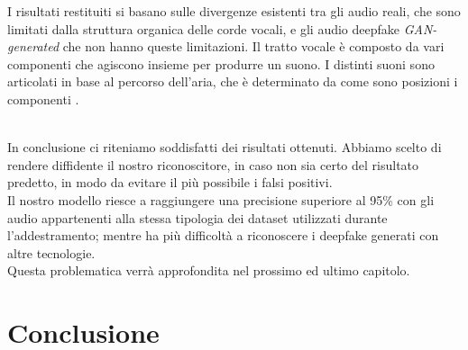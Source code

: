 \documentclass[12pt, a4paper]{article}
\begin{document}
\begin{minipage}{0.6\textwidth}
I risultati restituiti si basano sulle divergenze esistenti tra gli audio reali, che sono limitati dalla struttura organica delle corde vocali, e gli audio deepfake \textit{GAN-generated} che non hanno queste limitazioni. Il tratto vocale è composto da vari componenti che agiscono insieme per produrre un suono. I distinti suoni sono articolati in base al percorso dell'aria, che è determinato da come sono posizioni i componenti \cite{280020}.\\
\end{minipage}
\\
In conclusione ci riteniamo soddisfatti dei risultati ottenuti. Abbiamo scelto di rendere diffidente il nostro riconoscitore, in caso non sia certo del risultato predetto, in modo da evitare il più possibile i falsi positivi.\\ 
Il nostro modello riesce a raggiungere una precisione superiore al 95\% con gli audio appartenenti alla stessa tipologia dei dataset utilizzati durante l'addestramento; mentre ha più difficoltà a riconoscere i deepfake generati con altre tecnologie.\\
Questa problematica verrà approfondita nel prossimo ed ultimo capitolo.
\newpage
\section{Conclusione}






\newpage


\end{document}
